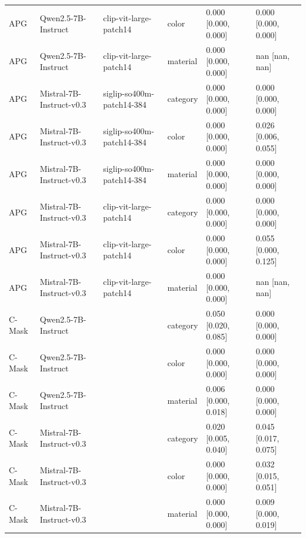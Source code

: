 \begin{tabular}{llllll}
APG & Qwen2.5-7B-Instruct & clip-vit-large-patch14 & color & 0.000 [0.000, 0.000] & 0.000 [0.000, 0.000] \\
APG & Qwen2.5-7B-Instruct & clip-vit-large-patch14 & material & 0.000 [0.000, 0.000] & nan [nan, nan] \\
APG & Mistral-7B-Instruct-v0.3 & siglip-so400m-patch14-384 & category & 0.000 [0.000, 0.000] & 0.000 [0.000, 0.000] \\
APG & Mistral-7B-Instruct-v0.3 & siglip-so400m-patch14-384 & color & 0.000 [0.000, 0.000] & 0.026 [0.006, 0.055] \\
APG & Mistral-7B-Instruct-v0.3 & siglip-so400m-patch14-384 & material & 0.000 [0.000, 0.000] & 0.000 [0.000, 0.000] \\
APG & Mistral-7B-Instruct-v0.3 & clip-vit-large-patch14 & category & 0.000 [0.000, 0.000] & 0.000 [0.000, 0.000] \\
APG & Mistral-7B-Instruct-v0.3 & clip-vit-large-patch14 & color & 0.000 [0.000, 0.000] & 0.055 [0.000, 0.125] \\
APG & Mistral-7B-Instruct-v0.3 & clip-vit-large-patch14 & material & 0.000 [0.000, 0.000] & nan [nan, nan] \\
C-Mask & Qwen2.5-7B-Instruct &  & category & 0.050 [0.020, 0.085] & 0.000 [0.000, 0.000] \\
C-Mask & Qwen2.5-7B-Instruct &  & color & 0.000 [0.000, 0.000] & 0.000 [0.000, 0.000] \\
C-Mask & Qwen2.5-7B-Instruct &  & material & 0.006 [0.000, 0.018] & 0.000 [0.000, 0.000] \\
C-Mask & Mistral-7B-Instruct-v0.3 &  & category & 0.020 [0.005, 0.040] & 0.045 [0.017, 0.075] \\
C-Mask & Mistral-7B-Instruct-v0.3 &  & color & 0.000 [0.000, 0.000] & 0.032 [0.015, 0.051] \\
C-Mask & Mistral-7B-Instruct-v0.3 &  & material & 0.000 [0.000, 0.000] & 0.009 [0.000, 0.019] \\
\bottomrule
\end{tabular}
